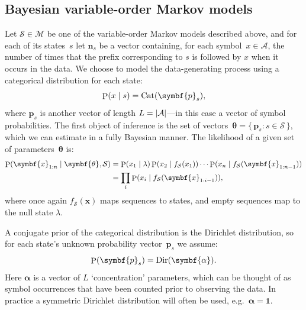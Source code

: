 \documentclass[11pt,a4paper]{article}
\newcommand\mc[1]{\mathcal{#1}}               %
\newcommand\ub[1]{\symbf{#1}}                 %
\DeclareMathOperator\Pb{P}                    %
\DeclarePairedDelimiter\lr{\lparen}{\rparen}  %
\DeclarePairedDelimiter\abs{\lvert}{\rvert}   %
\DeclareMathOperator\cat{Cat}            %
\DeclareMathOperator\dir{Dir}            %
\begin{document}
\subsection{Bayesian variable-order Markov models} %

Let \(\mc{S} \in \mc{M}\) be one of the variable-order Markov models described
above, and for each of its states~\(s\) let \(\ub{n}_s\) be a vector containing,
for each symbol~\(x \in \mc{A}\), the number of times that the prefix
corresponding to \(s\) is followed by \(x\) when it occurs in the data. We
choose to model the data-generating process using a categorical distribution for
each state:
\begin{equation*}
  \Pb\lr{x \mid s} = \cat\lr{\ub{p}_s},
\end{equation*}
where \(\ub{p}_s\) is another vector of length \(L = \abs{\mc{A}}\)---in this
case a vector of symbol probabilities. The first object of inference is the set
of vectors~\(\ub{\theta} = \{\,\ub{p}_s : s \in \mc{S}\,\}\), which we can
estimate in a fully Bayesian manner. The likelihood of a given set of
parameters~\(\ub{\theta}\) is:
\begin{align*}
  \Pb\lr{\ub{x}_{1:n} \mid \ub{\theta}, \mc{S}} &= \Pb\lr{x_1 \mid \lambda}
    \Pb\lr{x_2 \mid f_{\mc{S}}\lr{x_1}} \dotsm
    \Pb\lr{x_n \mid f_{\mc{S}}\lr{\ub{x}_{1:n-1}}} \\
  &= \prod_i \Pb\lr{x_i \mid f_{\mc{S}}\lr{\ub{x}_{1:i-1}}},
\end{align*}
where once again \(f_{\mc{S}}(\ub{x})\) maps sequences to states, and empty
sequences map to the null state \(\lambda\).

A conjugate prior of the categorical distribution is the Dirichlet distribution,
so for each state's unknown probability vector~\(\ub{p}_s\) we assume:
\begin{equation*}
  \Pb\lr{\ub{p}_s} = \dir\lr{\ub{\alpha}}.
\end{equation*}
Here \(\ub{\alpha}\) is a vector of \(L\) `concentration' parameters, which can
be thought of as symbol occurrences that have been counted prior to observing
the data. In practice a symmetric Dirichlet distribution will often be used,
e.g.~\(\ub{\alpha} = \ub{1}\).
\end{document}
